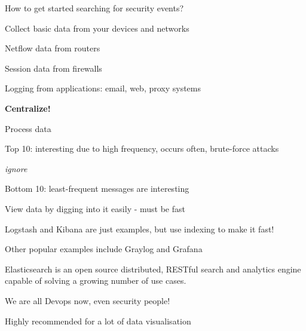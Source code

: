 \documentclass[Screen16to9,17pt]{foils}
\begin{document}

\begin{list1}
\item How to get started searching for security events?
\item Collect basic data from your devices and networks
\begin{list2}
\item Netflow data from routers
\item Session data from firewalls
\item Logging from applications: email, web, proxy systems
\end{list2}
\item {\bf Centralize!}
\item Process data
\begin{list2}
\item Top 10: interesting due to high frequency, occurs often, brute-force attacks
\item {\it ignore}
\item Bottom 10: least-frequent messages are interesting
\end{list2}
\end{list1}





\begin{list1}
\item View data by digging into it easily - must be fast
\item Logstash and Kibana are just examples, but use indexing to make it fast!
\item Other popular examples include Graylog and Grafana
\end{list1}



Elasticsearch is an open source distributed, RESTful search and analytics engine capable of solving a growing number of use cases.


\vskip 1cm
\centerline{We are all Devops now, even security people!}




\centerline{Highly recommended for a lot of data visualisation}
\end{document}
